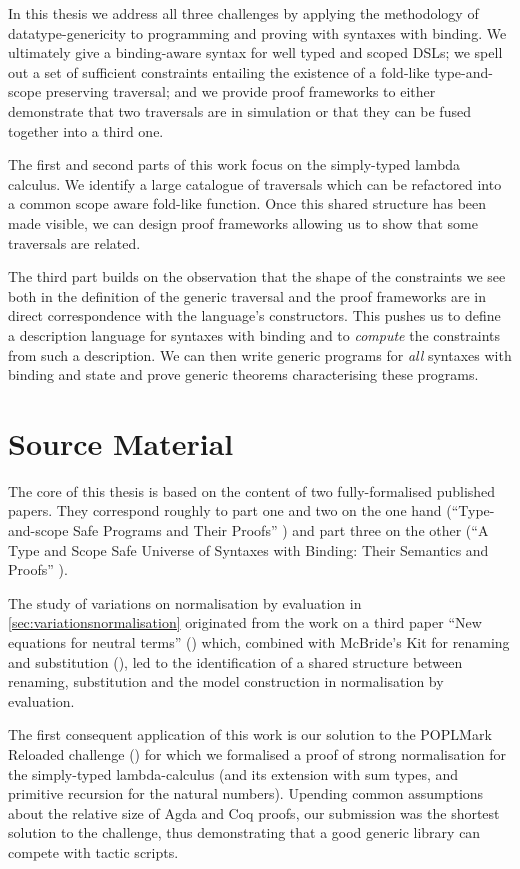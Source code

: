 In this thesis we address all three challenges by applying the methodology of
datatype-genericity to programming and proving with syntaxes with binding.
We ultimately give a binding-aware syntax for well typed and scoped DSLs; we
spell out a set of sufficient constraints entailing the existence of a fold-like
type-and-scope preserving traversal; and we provide proof frameworks
to either demonstrate that two traversals are in simulation or that they can be
fused together into a third one.

The first and second parts of this work focus on the simply-typed lambda calculus.
We identify a large catalogue of traversals which can be refactored into a common
scope aware fold-like function. Once this shared structure has been made
visible, we can design proof frameworks allowing us to show that some traversals
are related.

The third part builds on the observation that the shape of the constraints we
see both in the definition of the generic traversal and the proof frameworks
are in direct correspondence with the language's constructors. This pushes us
to define a description language for syntaxes with binding and to \emph{compute}
the constraints from such a description. We can then write generic programs for
\emph{all} syntaxes with binding and state and prove generic theorems characterising
these programs.

\section{Source Material}

The core of this thesis is based on the content of two fully-formalised
published papers. They
correspond roughly to part one and two on the one hand
(``Type-and-scope Safe Programs and Their Proofs'' \cite{allais2017type, repo2017})
and part three on the other
(``A Type and Scope Safe Universe of Syntaxes with Binding: Their Semantics and Proofs''
\cite{generic-syntax, repo2018}).

The study of variations on normalisation by evaluation in \cref{sec:variationsnormalisation}
originated from the work on a third paper ``New equations for neutral terms''
(\cite{new-equations}) which, combined with McBride's Kit for renaming and substitution
(\citeyear{mcbride2005type}), led to the identification of a shared structure between renaming,
substitution and the model construction in normalisation by evaluation.

The first consequent application of this work is our solution to the
POPLMark Reloaded challenge
(\cite{poplmarkreloaded, poplmark2}) for which we formalised a proof of
strong normalisation for the simply-typed lambda-calculus (and its extension
with sum types, and primitive recursion for the natural numbers).
%
Upending common assumptions about the relative size of Agda and Coq proofs,
our submission was the shortest solution to the challenge, thus demonstrating
that a good generic library can compete with tactic scripts.

